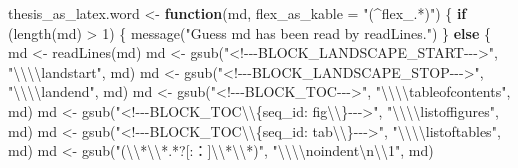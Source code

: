 \documentclass[
]{article}
\newenvironment{Shaded}{\begin{snugshade}}{\end{snugshade}}
\newcommand{\AttributeTok}[1]{\textcolor[rgb]{0.77,0.63,0.00}{#1}}
\newcommand{\ControlFlowTok}[1]{\textcolor[rgb]{0.13,0.29,0.53}{\textbf{#1}}}
\newcommand{\DecValTok}[1]{\textcolor[rgb]{0.00,0.00,0.81}{#1}}
\newcommand{\FunctionTok}[1]{\textcolor[rgb]{0.00,0.00,0.00}{#1}}
\newcommand{\NormalTok}[1]{#1}
\newcommand{\OtherTok}[1]{\textcolor[rgb]{0.56,0.35,0.01}{#1}}
\newcommand{\SpecialCharTok}[1]{\textcolor[rgb]{0.00,0.00,0.00}{#1}}
\newcommand{\StringTok}[1]{\textcolor[rgb]{0.31,0.60,0.02}{#1}}
\begin{document}
\begin{Shaded}
\begin{Highlighting}[]
\NormalTok{thesis\_as\_latex.word }\OtherTok{\textless{}{-}} \ControlFlowTok{function}\NormalTok{(md, }\AttributeTok{flex\_as\_kable =} \StringTok{"(\^{}flex\_.*)"}\NormalTok{) \{}
  \ControlFlowTok{if}\NormalTok{ (}\FunctionTok{length}\NormalTok{(md) }\SpecialCharTok{\textgreater{}} \DecValTok{1}\NormalTok{) \{}
    \FunctionTok{message}\NormalTok{(}\StringTok{"Guess \textasciigrave{}md\textasciigrave{} has been read by readLines."}\NormalTok{)}
\NormalTok{  \} }\ControlFlowTok{else}\NormalTok{ \{}
\NormalTok{    md }\OtherTok{\textless{}{-}} \FunctionTok{readLines}\NormalTok{(md)}
\NormalTok{    md }\OtherTok{\textless{}{-}} \FunctionTok{gsub}\NormalTok{(}\StringTok{"\textless{}!{-}{-}{-}BLOCK\_LANDSCAPE\_START{-}{-}{-}\textgreater{}"}\NormalTok{, }\StringTok{"}\SpecialCharTok{\textbackslash{}\textbackslash{}\textbackslash{}\textbackslash{}}\StringTok{landstart"}\NormalTok{, md)}
\NormalTok{    md }\OtherTok{\textless{}{-}} \FunctionTok{gsub}\NormalTok{(}\StringTok{"\textless{}!{-}{-}{-}BLOCK\_LANDSCAPE\_STOP{-}{-}{-}\textgreater{}"}\NormalTok{, }\StringTok{"}\SpecialCharTok{\textbackslash{}\textbackslash{}\textbackslash{}\textbackslash{}}\StringTok{landend"}\NormalTok{, md)}
\NormalTok{    md }\OtherTok{\textless{}{-}} \FunctionTok{gsub}\NormalTok{(}\StringTok{"\textless{}!{-}{-}{-}BLOCK\_TOC{-}{-}{-}\textgreater{}"}\NormalTok{, }\StringTok{"}\SpecialCharTok{\textbackslash{}\textbackslash{}\textbackslash{}\textbackslash{}}\StringTok{tableofcontents"}\NormalTok{, md)}
\NormalTok{    md }\OtherTok{\textless{}{-}} \FunctionTok{gsub}\NormalTok{(}\StringTok{"\textless{}!{-}{-}{-}BLOCK\_TOC}\SpecialCharTok{\textbackslash{}\textbackslash{}}\StringTok{\{seq\_id: \textquotesingle{}fig\textquotesingle{}}\SpecialCharTok{\textbackslash{}\textbackslash{}}\StringTok{\}{-}{-}{-}\textgreater{}"}\NormalTok{, }\StringTok{"}\SpecialCharTok{\textbackslash{}\textbackslash{}\textbackslash{}\textbackslash{}}\StringTok{listoffigures"}\NormalTok{, md)}
\NormalTok{    md }\OtherTok{\textless{}{-}} \FunctionTok{gsub}\NormalTok{(}\StringTok{"\textless{}!{-}{-}{-}BLOCK\_TOC}\SpecialCharTok{\textbackslash{}\textbackslash{}}\StringTok{\{seq\_id: \textquotesingle{}tab\textquotesingle{}}\SpecialCharTok{\textbackslash{}\textbackslash{}}\StringTok{\}{-}{-}{-}\textgreater{}"}\NormalTok{, }\StringTok{"}\SpecialCharTok{\textbackslash{}\textbackslash{}\textbackslash{}\textbackslash{}}\StringTok{listoftables"}\NormalTok{, md)}
\NormalTok{    md }\OtherTok{\textless{}{-}} \FunctionTok{gsub}\NormalTok{(}\StringTok{"(}\SpecialCharTok{\textbackslash{}\textbackslash{}}\StringTok{*}\SpecialCharTok{\textbackslash{}\textbackslash{}}\StringTok{*.*?[:：]}\SpecialCharTok{\textbackslash{}\textbackslash{}}\StringTok{*}\SpecialCharTok{\textbackslash{}\textbackslash{}}\StringTok{*)"}\NormalTok{, }\StringTok{"}\SpecialCharTok{\textbackslash{}\textbackslash{}\textbackslash{}\textbackslash{}}\StringTok{noindent}\SpecialCharTok{\textbackslash{}n\textbackslash{}\textbackslash{}}\StringTok{1"}\NormalTok{, md)}

\end{Highlighting}
\end{Shaded}
\end{document}

